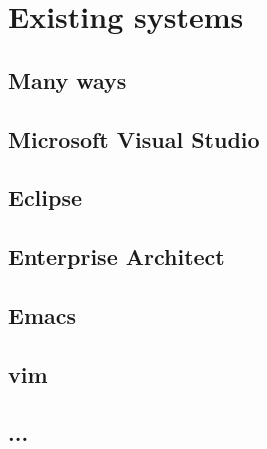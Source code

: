 
\chapter{Existing systems}


\section{Many ways}


\section{Microsoft Visual Studio}

\section{Eclipse}

\section{Enterprise Architect}

\section{Emacs}

\section{vim}

\section{...}

